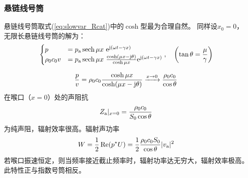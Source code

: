 \documentclass[UTF8]{ctexbook}
\begin{document}
\subsubsection{悬链线号筒}
悬链线号筒取式(\ref{eq:slowvar_Rcat})中的$\cosh$型最为合理自然。
同样设$x_0=0$，无限长悬链线号筒的解为：
\begin{equation}
	\begin{cases}
	p&=p\st{a}\sech \mu x \ \me^{\mj (\omega t-\gamma x)}\\
	\rho_0 c_0 v & = p\st{a} \sech \mu x\ \frac{
	\cosh (\mu x-\mj \theta)}{\cosh \mu x} \me^{\mj(\omega t-\gamma x)}
	\end{cases}
	\qc 
	\qty(\tan \theta = \frac{\mu}{\gamma })
\end{equation}

\begin{equation}
	\frac{p}{v} = \rho_0c_0 \frac{\cosh \mu x}{\cosh (\mu x-\mathrm{j} \theta)}
	\xrightarrow{x\to 0} \frac{\rho_0c_0}{\cos\theta}
\end{equation}
在喉口（$x=0$）处的声阻抗
$$Z_\text{a}|_{x=0} = \frac{\rho_0c_0}{S_0\cos\theta}$$
为纯声阻，辐射效率很高。辐射声功率
$$W = \frac12 \Re (p^*U) = \frac{1}{2}\frac{\rho_0c_0S_0}{\cos\theta}
|v_\text{a}|^2$$
若喉口振速恒定，则当频率接近截止频率时，辐射功率达无穷大，辐射效率极高。
此特性正与指数号筒相反。
\end{document}
